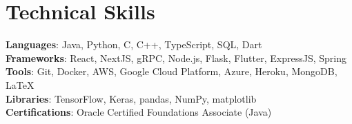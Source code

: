 \documentclass[letterpaper,11pt]{article}
\begin{document}
\section{Technical Skills}
 \begin{itemize}[leftmargin=0.15in, label={}]
    \small{\item{
     \textbf{Languages}{: Java, Python, C, C++, TypeScript, SQL, Dart} \\
     \textbf{Frameworks}{: React, NextJS, gRPC, Node.js, Flask, Flutter, ExpressJS, Spring} \\
     \textbf{Tools}{: Git, Docker, AWS, Google Cloud Platform, Azure, Heroku, MongoDB, \LaTeX} \\
     \textbf{Libraries}{: TensorFlow, Keras, pandas, NumPy, matplotlib} \\
     \textbf{Certifications}{: Oracle Certified Foundations Associate (Java)}
    }}
 \end{itemize}


\end{document}
